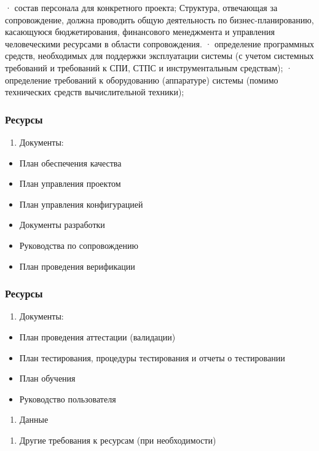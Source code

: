 \documentclass{industrial-development}
\begin{document}
\lecturenotes
· состав персонала для конкретного проекта;
Структура, отвечающая за сопровождение, должна проводить общую деятельность по бизнес-планированию, касающуюся бюджетирования, финансового менеджмента и управления человеческими ресурсами в области сопровождения. 
· определение программных средств, необходимых для поддержки эксплуатации системы (с учетом системных требований и требований к СПИ, СТПС и инструментальным средствам); 
· определение требований к оборудованию (аппаратуре) системы (помимо технических средств вычислительной техники); 

\begin{frame} \frametitle{Ресурсы}
	\begin{enumerate}[5] \item Документы: \end{enumerate}
	\begin{itemize}
		\item План обеспечения качества
		\item План управления проектом 
		\item План управления конфигурацией 
		\item Документы разработки 
		\item Руководства по сопровождению 
		\item План проведения верификации 
	\end{itemize}
	
\end{frame}

\lecturenotes

\begin{frame} \frametitle{Ресурсы}
	\begin{enumerate}[5] \item Документы: \end{enumerate}
	\begin{itemize} 
		\item План проведения аттестации (валидации) 
		\item План тестирования, процедуры тестирования и отчеты о тестировании 
		\item План обучения 
		\item Руководство пользователя
	\end{itemize}
	\begin{enumerate}[6] \item Данные   \end{enumerate}
	\begin{enumerate}[7] \item Другие требования к ресурсам (при необходимости) \end{enumerate}
	
\end{frame}
\end{document}
